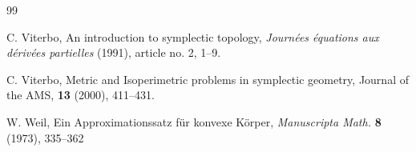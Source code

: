 \documentclass[12pt]{amsart}
\theoremstyle{definition}
\begin{document}
\begin{thebibliography} {99}






 C. Viterbo, An introduction to symplectic topology, {\em Journ\'{e}es \'{e}quations aux d\'{e}riv\'{e}es partielles} (1991), article no. 2, 1--9. 

 C. Viterbo, Metric and Isoperimetric problems in symplectic geometry, Journal of the AMS, \textbf{13} (2000), 411--431.


 W. Weil, Ein Approximationssatz f\"{u}r konvexe K\"{o}rper, {\em Manuscripta Math.} \textbf{8} (1973), 335--362



\end{thebibliography}
\end{document}
